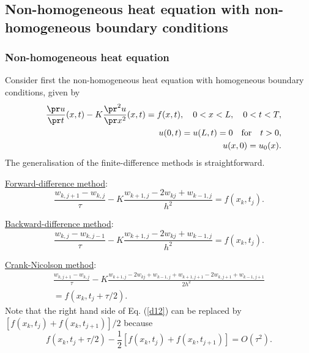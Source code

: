 %
%
%


\subsection{Non-homogeneous heat equation with non-homogeneous boundary conditions}

\subsubsection{Non-homogeneous heat equation}

Consider first the non-homogeneous heat equation with homogeneous
boundary conditions, given by
\begin{eqnarray}
&&\frac{\pr u}{\pr t}(x,t) - K\frac{\pr^{2} u}{\pr x^{2}}(x,t)=f(x,t), \quad
0<x< L, \quad 0<t<T,   \label{d1} \\
&&u(0, t) = u(L, t)=0 \quad \hbox{for} \quad t>0,   \label{d2} \\
&&u(x, 0) = u_{0}(x).   \label{d3}
\end{eqnarray}
The generalisation of the finite-difference methods is straightforward.
 
\underline{Forward-difference method}:
\begin{equation}
\frac{w_{k,j+1}-w_{k,j}}{\tau}-K
\frac{w_{k+1, j}-2w_{kj}+w_{k-1,j}}{h^{2}}=f(x_k,t_j). \label{d10}
\end{equation}

\underline{Backward-difference method}:
\begin{equation}
\frac{w_{k,j}-w_{k,j-1}}{\tau}-K
\frac{w_{k+1, j}-2w_{kj}+w_{k-1,j}}{h^{2}}=f(x_k,t_j). \label{d11}
\end{equation}

\underline{Crank-Nicolson method}:
\begin{multline}
\frac{w_{k,j+1}-w_{k,j}}{\tau}-
K \frac{w_{k+1,j}-2w_{kj}+w_{k-1,j}+
w_{k+1,j+1}-2w_{k,j+1}+w_{k-1,j+1}}{2h^{2}}\\
=f(x_k,t_j+\tau/2). \label{d12}
\end{multline}
Note that the right hand side of Eq. (\ref{d12}) can be replaced by
$[f(x_k,t_j)+f(x_k,t_{j+1})]/2$ because
\[
f(x_k,t_j+\tau/2)-\frac{1}{2}[f(x_k,t_j)+f(x_k,t_{j+1})]=O(\tau^2).
\]
 
